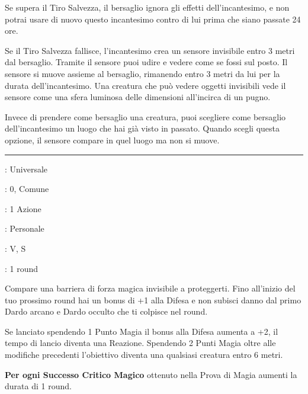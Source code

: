 \begin{multicols}{2}
Se supera il Tiro Salvezza, il bersaglio ignora gli effetti dell'incantesimo, e non potrai usare di nuovo questo incantesimo contro di lui prima che siano passate 24 ore.

Se il Tiro Salvezza fallisce, l'incantesimo crea un sensore invisibile entro 3 metri dal bersaglio. Tramite il sensore puoi udire e vedere come se fossi sul posto. Il sensore si muove assieme al bersaglio, rimanendo entro 3 metri da lui per la durata dell'incantesimo. Una creatura che può vedere oggetti invisibili vede il sensore come una sfera luminosa delle dimensioni all'incirca di un pugno.

Invece di prendere come bersaglio una creatura, puoi scegliere come bersaglio dell'incantesimo un luogo che hai già visto in passato. Quando scegli questa opzione, il sensore compare in quel luogo ma non si muove.

\smallskip\noindent\rule{\linewidth}{2pt} \hypertarget{Scudo}{}\smallskip{}
\noindent
\begin{description}[noitemsep, topsep=0pt, parsep=0pt, partopsep=0pt, leftmargin=0cm, labelwidth=2.8cm]
	\item[\textbf{Lista di Magia}]: Universale
	\item[\textbf{Livello}]: 0, Comune
	\item[\textbf{T. di Lancio}]: 1 Azione
	\item[\textbf{Gittata}]: Personale
	\item[\textbf{Componenti}]: V, S
	\item[\textbf{Durata}]: 1 round
\end{description}

Compare una barriera di forza magica invisibile a proteggerti. Fino all'inizio del tuo prossimo round hai un bonus di +1 alla Difesa e non subisci danno dal primo Dardo arcano e Dardo occulto che ti colpisce nel round.

Se lanciato spendendo 1 Punto Magia il bonus alla Difesa aumenta a +2, il tempo di lancio diventa una Reazione. Spendendo 2 Punti Magia oltre alle modifiche precedenti l'obiettivo diventa una qualsiasi creatura entro 6 metri.

\textbf{Per ogni Successo Critico Magico} ottenuto nella Prova di Magia aumenti la durata di 1 round.


\end{multicols}
